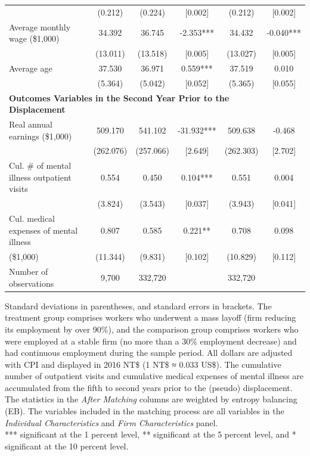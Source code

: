 \documentclass[12pt]{article}
\begin{document}
\begin{table}[htbp]
{\begin{tabular}{lccccc}
          & (0.212) & (0.224) & [0.002] & (0.212) & [0.002] \\
    Average monthly wage (\$1,000) & 34.392 & 36.745 & -2.353*** & 34.432 & -0.040*** \\
          & (13.011) & (13.518) & [0.005] & (13.027) & [0.005] \\
    Average age & 37.530 & 36.971 & 0.559*** & 37.519 & 0.010 \\
          & (5.364) & (5.042) & [0.052] & (5.365) & [0.055] \\
          \midrule
    \multicolumn{5}{l}{\textbf{Outcomes Variables in the Second Year Prior to the Displacement}}  \\
    Real annual earnings (\$1,000) & 509.170 & 541.102 & -31.932*** & 509.638 & -0.468 \\
          & (262.076) & (257.066) & [2.649] & (262.303) & [2.702] \\

    Cul. \# of mental illness outpatient visits & 0.554 & 0.450 & 0.104*** & 0.551 & 0.004 \\
          & (3.824) & (3.543) & [0.037] & (3.943) & [0.041] \\

    Cul. medical expenses of mental illness & 0.807 & 0.585 & 0.221** & 0.708 & 0.098 \\
         (\$1,000) & (11.344) & (9.831) & [0.102] & (10.829) & [0.112] \\

          \midrule \midrule
    Number of observations & 9,700 & 332,720 &       & 332,720 &  \\
\bottomrule
    \end{tabular}%
}
  \label{tab:t1}%
\end{table}%
\vspace{-2em}
\begin{singlespace}
        \begin{footnotesize}
        		 Standard deviations in parentheses, and standard errors in brackets. The treatment group comprises workers who underwent a mass layoff (firm reducing its employment by over 90\%), and the comparison group comprises workers who were employed at a stable firm (no more than a 30\% employment decrease) and had continuous employment during the sample period. All dollars are adjusted with CPI and displayed in 2016 NT\$ (1 NT\$ ≈ 0.033 US\$). The cumulative number of outpatient visits and cumulative medical expenses of mental illness are accumulated from the fifth to second years prior to the (pseudo) displacement. The statistics in the {\it After Matching} columns are weighted by entropy balancing (EB). The variables included in the matching process are all variables in the {\it Individual Characteristics} and {\it Firm Characteristics} panel. \\
		*** significant at the 1 percent level, ** significant at the 5 percent level, and * significant at the 10 percent level.
        \end{footnotesize}
\end{singlespace}
\end{document}

